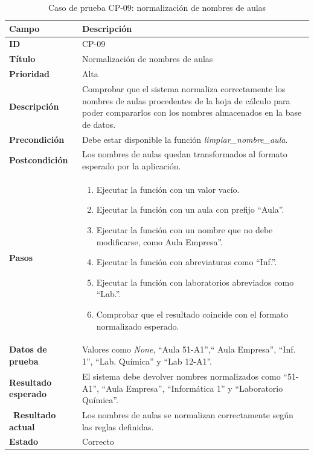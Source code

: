 \begin{table}[H]
	\centering
	\small
	\renewcommand{\arraystretch}{1.2}
	\begin{tabularx}{\textwidth}{@{}p{3.5cm}X@{}}
		\toprule
		\textbf{Campo} & \textbf{Descripción} \\
		\midrule
		\textbf{ID} & CP-09 \\
		\textbf{Título} & Normalización de nombres de aulas \\
		\textbf{Prioridad} & Alta \\
		\textbf{Descripción} & Comprobar que el sistema normaliza correctamente los nombres de aulas procedentes de la hoja de cálculo para poder compararlos con los nombres almacenados en la base de datos. \\
		\textbf{Precondición} & Debe estar disponible la función \textit{limpiar\_nombre\_aula}. \\
		\textbf{Postcondición} & Los nombres de aulas quedan transformados al formato esperado por la aplicación. \\
		\textbf{Pasos} &
		\begin{enumerate}
			\item Ejecutar la función con un valor vacío.
			\item Ejecutar la función con un aula con prefijo ``Aula''. \item Ejecutar la función con un nombre que no debe modificarse, como Aula Empresa''.
			\item Ejecutar la función con abreviaturas como ``Inf.''. \item Ejecutar la función con laboratorios abreviados como ``Lab.''.
			\item Comprobar que el resultado coincide con el formato normalizado esperado.
		\end{enumerate} \\
		\textbf{Datos de prueba} & Valores como \textit{None}, ``Aula 51-A1'',`` Aula Empresa'', ``Inf. 1'', ``Lab. Química'' y ``Lab 12-A1''. \\ \textbf{Resultado esperado} & El sistema debe devolver nombres normalizados como ``51-A1'', ``Aula Empresa'', ``Informática 1'' y ``Laboratorio Química''. \\\
		\textbf{Resultado actual} & Los nombres de aulas se normalizan correctamente según las reglas definidas. \\
		\textbf{Estado} & Correcto \\
		\bottomrule
	\end{tabularx}
	\caption{Caso de prueba CP-09: normalización de nombres de aulas}
	\label{tab}
\end{table}